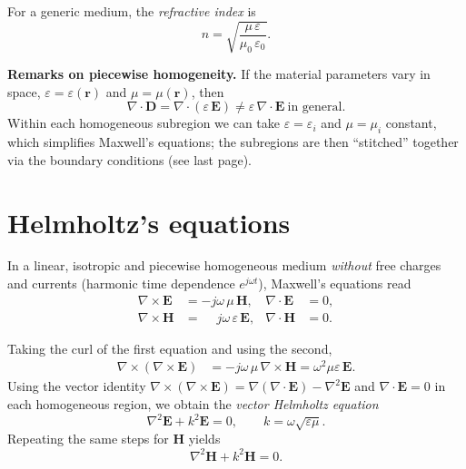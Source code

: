 For a generic medium, the \emph{refractive index} is
\begin{equation}
    n=\sqrt{\frac{\mu\,\varepsilon}{\mu_0\,\varepsilon_0}}.
\end{equation}

\medskip

\noindent\textbf{Remarks on piecewise homogeneity.}
If the material parameters vary in space, $\varepsilon=\varepsilon(\mathbf{r})$ and $\mu=\mu(\mathbf{r})$, then
\[
\nabla\!\cdot\!\mathbf{D}=\nabla\!\cdot(\varepsilon\,\mathbf{E})
\neq \varepsilon\,\nabla\!\cdot\!\mathbf{E}\ \text{in general}.
\]
Within each homogeneous subregion we can take $\varepsilon=\varepsilon_i$ and $\mu=\mu_i$ constant, which simplifies Maxwell’s equations; the subregions are then “stitched” together via the boundary conditions (see last page).

\section{Helmholtz’s equations}

In a linear, isotropic and piecewise homogeneous medium \emph{without} free charges and currents (harmonic time dependence $e^{j\omega t}$), Maxwell’s equations read
\begin{align}
    \nabla\times \mathbf{E} &= -j\omega\,\mu\,\mathbf{H}, 
    & \nabla\!\cdot\!\mathbf{E} &= 0, \\
    \nabla\times \mathbf{H} &= \phantom{-}j\omega\,\varepsilon\,\mathbf{E},
    & \nabla\!\cdot\!\mathbf{H} &= 0 .
\end{align}

Taking the curl of the first equation and using the second,
\begin{align}
    \nabla\times(\nabla\times \mathbf{E})
    &= -j\omega\,\mu\,\nabla\times \mathbf{H}
    = \omega^2 \mu\varepsilon\,\mathbf{E}.
\end{align}
Using the vector identity $\nabla\times(\nabla\times \mathbf{E})
=\nabla(\nabla\!\cdot\!\mathbf{E})-\nabla^2\mathbf{E}$ and $\nabla\!\cdot\!\mathbf{E}=0$ in each homogeneous region, we obtain the \emph{vector Helmholtz equation}
\begin{equation}
    \nabla^2 \mathbf{E} + k^2 \mathbf{E}=0,
    \qquad
    k=\omega\sqrt{\varepsilon\mu}.
\end{equation}
Repeating the same steps for $\mathbf{H}$ yields
\begin{equation}
    \nabla^2 \mathbf{H} + k^2 \mathbf{H}=0.
\end{equation}

